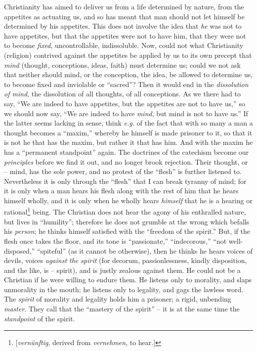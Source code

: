 Christianity has aimed to deliver us from a life determined by nature, from 
the appetites as actuating us, and so has meant that man should not let 
himself be determined by his appetites. This does not involve the idea that 
\textit{he} was not to have appetites, but that the appetites were not to have 
him, that they were not to become \textit{fixed}, uncontrollable, 
indissoluble. Now, could not what Christianity (religion) contrived against 
the appetites be applied by us to its own precept that \textit{mind} (thought, 
conceptions, ideas, faith) must determine us; could we not ask that neither 
should mind, or the conception, the idea, be allowed to determine us, to 
become fixed and inviolable or ``sacred''? Then it would end in the 
\textit{dissolution of mind}, the dissolution of all thoughts, of all 
conceptions. As we there had to say, ``We are indeed to have appetites, but 
the appetites are not to have us,'' so we should now say, ``We are indeed to 
have \textit{mind}, but mind is not to have us.'' If the latter seems lacking 
in sense, think \textit{e.g.} of the fact that with so many a man a thought 
becomes a ``maxim,'' whereby he himself is made prisoner to it, so that it 
is not he that has the maxim, but rather it that has him. And with the maxim 
he has a ``permanent standpoint'' again. The doctrines of the catechism 
become our \textit{principles} before we find it out, and no longer brook 
rejection. Their thought, or -- mind, has the sole power, and no protest of 
the ``flesh'' is further listened to. Nevertheless it is only through the 
``flesh'' that I can break tyranny of mind; for it is only when a man hears 
his flesh along with the rest of him that he hears himself wholly, and it is 
only when he wholly hears \textit{himself} that he is a hearing or 
rational\footnote{[\textit{vern\"unftig}, derived from \textit{vernehmen}, to 
hear.]} being. The Christian does not hear the agony of his enthralled nature, 
but lives in ``humility''; therefore he does not grumble at the wrong which 
befalls his \textit{person}; he thinks himself satisfied with the ``freedom 
of the spirit.'' But, if the flesh once takes the floor, and its tone is 
``passionate,'' ``indecorous,'' ``not well-disposed,'' ``spiteful'' 
(as it cannot be otherwise), then he thinks he hears voices of devils, voices 
\textit{against the spirit} (for decorum, passionlessness, kindly disposition, 
and the like, is -- spirit), and is justly zealous against them. He could not 
be a Christian if he were willing to endure them. He listens only to morality, 
and slaps unmorality in the mouth; he listens only to legality, and gags the 
lawless word. The \textit{spirit} of morality and legality holds him a 
prisoner; a rigid, unbending \textit{master}. They call that the ``mastery of 
the spirit'' -- it is at the same time the \textit{standpoint} of the spirit.

